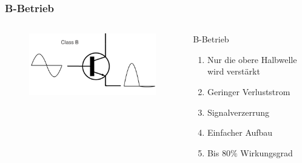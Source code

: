 \begin{frame}
  \frametitle{B-Betrieb}
  \begin{columns}[c]
    \begin{center}
      \begin{figure}
        \includegraphics[width=1\textwidth,height=.8\textheight,keepaspectratio]{a07/Electronic_Amplifier_Class_B_fixed.png}
      \end{figure}
    \end{center}
    \begin{block}{B-Betrieb}
      \begin{enumerate}
        \item Nur die obere Halbwelle wird verstärkt
        \item Geringer Verluststrom
        \item Signalverzerrung
        \item Einfacher Aufbau
        \item Bis $80\%$ Wirkungsgrad
      \end{enumerate}
    \end{block}
  \end{columns}
\end{frame}

